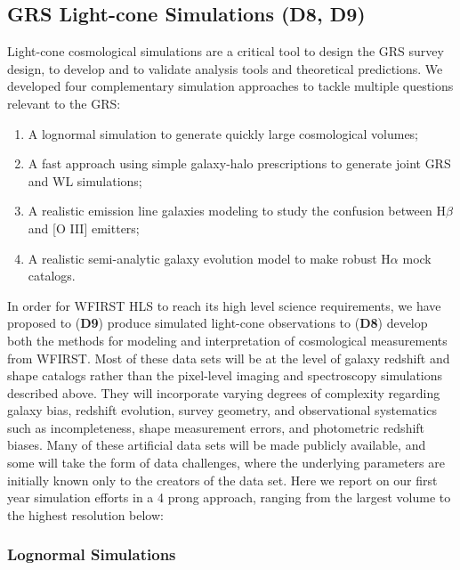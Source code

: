 \subsection{GRS Light-cone Simulations (D8, D9)}
\label{sec:light-cone}

 \begin{summaryii}
Light-cone cosmological simulations are a critical tool to design the GRS survey design, to develop and to validate analysis tools and theoretical predictions. We developed four complementary simulation approaches to tackle multiple questions relevant to the GRS:
\begin{enumerate}
  \item A lognormal simulation to generate quickly large cosmological volumes;
  \item A fast approach using simple galaxy-halo prescriptions to generate joint GRS and WL simulations;
  \item A realistic emission line galaxies modeling to study the confusion between H$\beta$ and [O III] emitters;
  \item A realistic semi-analytic galaxy evolution model to make robust H$\alpha$ mock catalogs.
 \end{enumerate}
 \end{summaryii}

 In order for WFIRST HLS to reach its  high level science requirements, we have
 proposed to ({\bf D9})  produce simulated light-cone observations to ({\bf D8})
 develop both the methods for modeling and interpretation of cosmological
 measurements from WFIRST.  Most of these data sets will be at the level of
 galaxy redshift and shape catalogs rather than the pixel-level imaging and
 spectroscopy simulations described above. They will incorporate varying degrees
 of complexity regarding galaxy bias, redshift evolution, survey geometry, and
 observational systematics such as incompleteness, shape measurement errors, and
 photometric redshift biases. Many of these artificial data sets will be made
 publicly available, and some will take the form of data challenges, where the
 underlying parameters are initially known only to the creators of the data set.
 Here we report on our first year simulation efforts  in a 4 prong approach,
 ranging from the largest volume to the highest resolution below:

\subsubsection{Lognormal Simulations}

